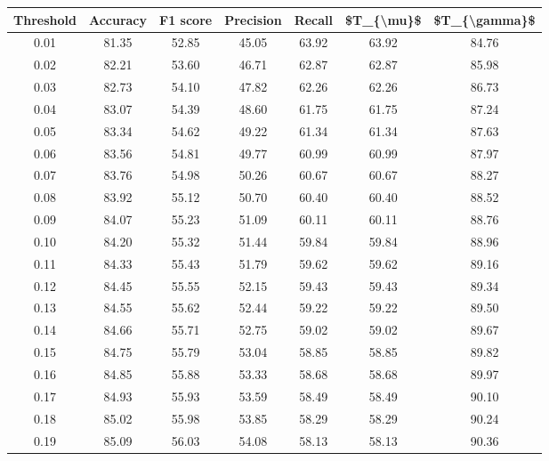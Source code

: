 \begin{tabular}{|c|c|c|c|c|c|c|}
\hline
 Threshold &  Accuracy &  F1 score &  Precision &  Recall &  \$T\_\{\textbackslash mu\}\$ &  \$T\_\{\textbackslash gamma\}\$ \\
\hline
      0.01 &     81.35 &     52.85 &      45.05 &   63.92 &      63.92 &         84.76 \\
      0.02 &     82.21 &     53.60 &      46.71 &   62.87 &      62.87 &         85.98 \\
      0.03 &     82.73 &     54.10 &      47.82 &   62.26 &      62.26 &         86.73 \\
      0.04 &     83.07 &     54.39 &      48.60 &   61.75 &      61.75 &         87.24 \\
      0.05 &     83.34 &     54.62 &      49.22 &   61.34 &      61.34 &         87.63 \\
      0.06 &     83.56 &     54.81 &      49.77 &   60.99 &      60.99 &         87.97 \\
      0.07 &     83.76 &     54.98 &      50.26 &   60.67 &      60.67 &         88.27 \\
      0.08 &     83.92 &     55.12 &      50.70 &   60.40 &      60.40 &         88.52 \\
      0.09 &     84.07 &     55.23 &      51.09 &   60.11 &      60.11 &         88.76 \\
      0.10 &     84.20 &     55.32 &      51.44 &   59.84 &      59.84 &         88.96 \\
      0.11 &     84.33 &     55.43 &      51.79 &   59.62 &      59.62 &         89.16 \\
      0.12 &     84.45 &     55.55 &      52.15 &   59.43 &      59.43 &         89.34 \\
      0.13 &     84.55 &     55.62 &      52.44 &   59.22 &      59.22 &         89.50 \\
      0.14 &     84.66 &     55.71 &      52.75 &   59.02 &      59.02 &         89.67 \\
      0.15 &     84.75 &     55.79 &      53.04 &   58.85 &      58.85 &         89.82 \\
      0.16 &     84.85 &     55.88 &      53.33 &   58.68 &      58.68 &         89.97 \\
      0.17 &     84.93 &     55.93 &      53.59 &   58.49 &      58.49 &         90.10 \\
      0.18 &     85.02 &     55.98 &      53.85 &   58.29 &      58.29 &         90.24 \\
      0.19 &     85.09 &     56.03 &      54.08 &   58.13 &      58.13 &         90.36 \\

\end{tabular}
